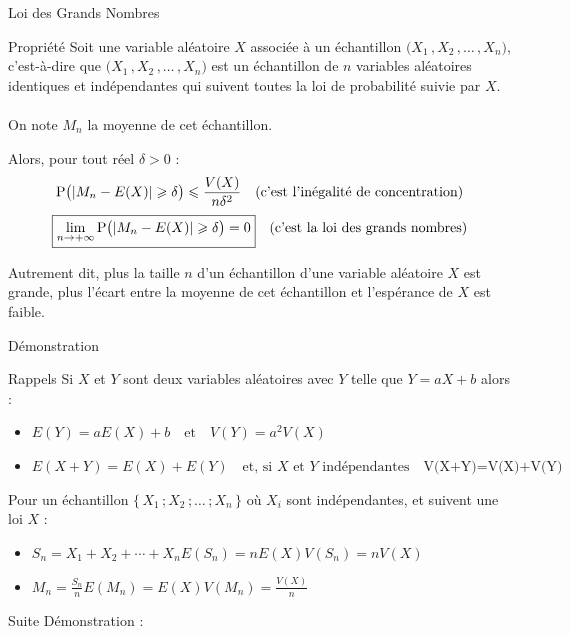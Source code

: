 \documentclass{coursbook}
\begin{document}
    \begin{Gpartie}{Loi des Grands Nombres}
        \vspace{-5ex}
        \begin{Spartie}{Propriété} 
            Soit une variable aléatoire $X$ associée à un échantillon $\big(X_1\,, X_2\,,\dotsc\,, X_n\big)$, c'est-à-dire que $\big(X_1\,, X_2\,,\dotsc\,, X_n\big)$ est un échantillon de $n$ variables aléatoires identiques et indépendantes qui suivent toutes la loi de probabilité suivie par $X$. \ \\ On note $M_n$ la moyenne de cet échantillon. 
            
            Alors, pour tout réel $\delta>0$ : \[\Pde\big(\lvert M_n-E(X)\rvert\geq\delta\big)\leq\frac{V(X)}{n\delta^2}\quad\text{(c'est l'inégalité de concentration)}\]\[\boxed{\lim\limits_{n\to +\infty}\mathrm{P}\big(\lvert M_n-E(X)\rvert\geqslant\delta\big)=0}\quad\text{(c'est la loi des grands nombres)}\]

            Autrement dit, plus la taille $n$ d'un échantillon d'une variable aléatoire $X$ est grande, plus l'écart entre la moyenne de cet échantillon et l'espérance de $X$ est faible. 
            \begin{SSpartie}{Démonstration} 
                \vspace{-5ex}
                \begin{SSSpartie}{Rappels} 
                    Si $X$ et $Y$ sont deux variables aléatoires avec $Y$ telle que $Y=aX+b$ alors :
                    \begin{itemize}
                        \item $E(Y)=aE(X)+b\quad\text{et}\quad V(Y)=a^2V(X)$
                        \item $E(X+Y)=E(X)+E(Y)\quad\text{et, si $X$ et $Y$ indépendantes}\quad \mbox{V(X+Y)=V(X)+V(Y)}$
                    \end{itemize}

                    Pour un échantillon $\big\{\,X_1\,; X_2\,;\dotso\,; X_n\,\big\}$ où $X_i$ sont indépendantes, et suivent une loi $X$ :
                    \begin{itemize}
                        \item $S_n=X_1+X_2+\dotsb+X_n$\quad$E\left(S_n\right)=nE(X)$\quad$V\left(S_n\right)=nV(X)$
                        \item $M_n=\frac{S_n}{n}$\quad$E\left(M_n\right)=E(X)$\quad$V\left(M_n\right)=\frac{V(X)}{n}$
                    \end{itemize}
                \end{SSSpartie}
                Suite Démonstration :


\end{SSpartie}
\end{Spartie}
\end{Gpartie}
\end{document}
